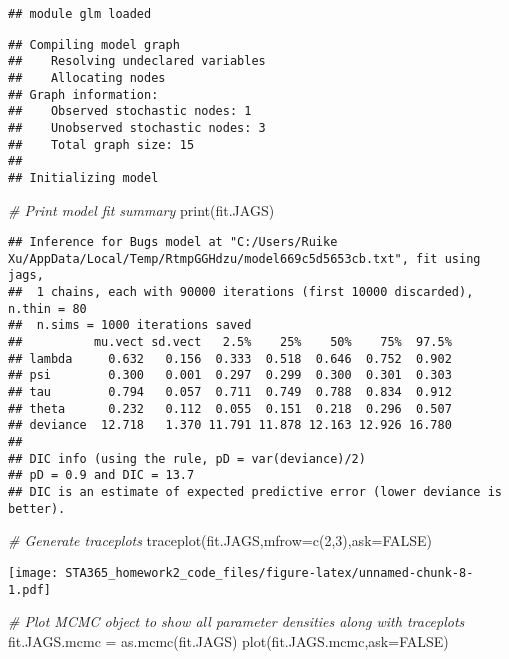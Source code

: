 \documentclass[
]{article}
\newenvironment{Shaded}{\begin{snugshade}}{\end{snugshade}}
\newcommand{\AttributeTok}[1]{\textcolor[rgb]{0.77,0.63,0.00}{#1}}
\newcommand{\CommentTok}[1]{\textcolor[rgb]{0.56,0.35,0.01}{\textit{#1}}}
\newcommand{\ConstantTok}[1]{\textcolor[rgb]{0.00,0.00,0.00}{#1}}
\newcommand{\DecValTok}[1]{\textcolor[rgb]{0.00,0.00,0.81}{#1}}
\newcommand{\FunctionTok}[1]{\textcolor[rgb]{0.00,0.00,0.00}{#1}}
\newcommand{\NormalTok}[1]{#1}
\newcommand{\OtherTok}[1]{\textcolor[rgb]{0.56,0.35,0.01}{#1}}
\begin{document}
\begin{verbatim}
## module glm loaded
\end{verbatim}

\begin{verbatim}
## Compiling model graph
##    Resolving undeclared variables
##    Allocating nodes
## Graph information:
##    Observed stochastic nodes: 1
##    Unobserved stochastic nodes: 3
##    Total graph size: 15
## 
## Initializing model
\end{verbatim}

\begin{Shaded}
\begin{Highlighting}[]
\CommentTok{\# Print model fit summary}
\FunctionTok{print}\NormalTok{(fit.JAGS)}
\end{Highlighting}
\end{Shaded}

\begin{verbatim}
## Inference for Bugs model at "C:/Users/Ruike Xu/AppData/Local/Temp/RtmpGGHdzu/model669c5d5653cb.txt", fit using jags,
##  1 chains, each with 90000 iterations (first 10000 discarded), n.thin = 80
##  n.sims = 1000 iterations saved
##          mu.vect sd.vect   2.5%    25%    50%    75%  97.5%
## lambda     0.632   0.156  0.333  0.518  0.646  0.752  0.902
## psi        0.300   0.001  0.297  0.299  0.300  0.301  0.303
## tau        0.794   0.057  0.711  0.749  0.788  0.834  0.912
## theta      0.232   0.112  0.055  0.151  0.218  0.296  0.507
## deviance  12.718   1.370 11.791 11.878 12.163 12.926 16.780
## 
## DIC info (using the rule, pD = var(deviance)/2)
## pD = 0.9 and DIC = 13.7
## DIC is an estimate of expected predictive error (lower deviance is better).
\end{verbatim}

\begin{Shaded}
\begin{Highlighting}[]
\CommentTok{\# Generate traceplots}
\FunctionTok{traceplot}\NormalTok{(fit.JAGS,}\AttributeTok{mfrow=}\FunctionTok{c}\NormalTok{(}\DecValTok{2}\NormalTok{,}\DecValTok{3}\NormalTok{),}\AttributeTok{ask=}\ConstantTok{FALSE}\NormalTok{)}
\end{Highlighting}
\end{Shaded}

\texttt{[image: STA365\_homework2\_code\_files/figure-latex/unnamed-chunk-8-1.pdf]}

\begin{Shaded}
\begin{Highlighting}[]
\CommentTok{\# Plot MCMC object to show all parameter densities along with traceplots}
\NormalTok{fit.JAGS.mcmc }\OtherTok{=} \FunctionTok{as.mcmc}\NormalTok{(fit.JAGS)}
\FunctionTok{plot}\NormalTok{(fit.JAGS.mcmc,}\AttributeTok{ask=}\ConstantTok{FALSE}\NormalTok{)}
\end{Highlighting}
\end{Shaded}
\end{document}
